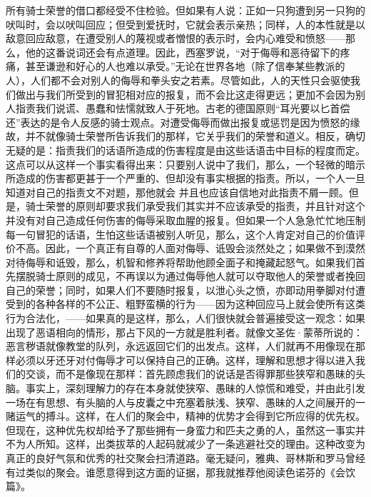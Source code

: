 \documentclass[12pt,oneside]{book}
\begin{document}
所有骑士荣誉的借口都经受不住检验。但如果有人说：正如一只狗遭到另一只狗的吠叫时，会以吠叫回应；但受到爱抚时，它就会表示亲热；同样，人的本性就是以敌意回应敌意，在遭受别人的蔑视或者憎恨的表示时，会内心难受和愤怒——那么，他的这番说词还会有点道理。因此，西塞罗说，“对于侮辱和恶待留下的疼痛，甚至谦逊和好心的人也难以承受。”无论在世界各地（除了信奉某些教派的人），人们都不会对别人的侮辱和拳头安之若素。尽管如此，人的天性只会驱使我们做出与我们所受到的冒犯相对应的报复，而不会比这走得更远；更加不会因为别人指责我们说谎、愚蠢和怯懦就致人于死地。古老的德国原则“耳光要以匕首偿还”表达的是令人反感的骑士观点。对遭受侮辱而做出报复或惩罚是因为愤怒的缘故，并不就像骑士荣誉所告诉我们的那样，它关乎我们的荣誉和道义。相反，确切无疑的是：指责我们的话语所造成的伤害程度是由这些话语击中目标的程度而定。这点可以从这样一个事实看得出来：只要别人说中了我们，那么，一个轻微的暗示所造成的伤害都更甚于一个严重的、但却没有事实根据的指责。所以，一个人一旦知道对自己的指责文不对题，那他就会
并且也应该自信地对此指责不屑一顾。但是，骑士荣誉的原则却要求我们承受我们其实并不应该承受的指责，并且针对这个并没有对自己造成任何伤害的侮辱采取血腥的报复。但如果一个人急急忙忙地压制每一句冒犯的话语，生怕这些话语被别人听见，那么，这个人肯定对自己的价值评价不高。因此，一个真正有自尊的人面对侮辱、诋毁会淡然处之；如果做不到漠然对待侮辱和诋毁，那么，机智和修养将帮助他顾全面子和掩藏起怒气。如果我们首先摆脱骑士原则的成见，不再误以为通过侮辱他人就可以夺取他人的荣誉或者挽回自己的荣誉；同时，如果人们不要随时报复，以泄心头之愤，亦即动用拳脚对付遭受到的各种各样的不公正、粗野蛮横的行为——因为这种回应马上就会使所有这类行为合法化，——如果真的是这样，那么，人们很快就会普遍接受这一观念：如果出现了恶语相向的情形，那占下风的一方就是胜利者。就像文圣佐·蒙蒂所说的：恶言秽语就像教堂的队列，永远返回它们的出发点。这样，人们就再不用像现在那样必须以牙还牙对付侮辱才可以保持自己的正确。这样，理解和思想才得以进入我们的交谈，而不是像现在那样：首先顾虑我们的说话是否得罪那些狭窄和愚昧的头脑。事实上，深刻理解力的存在本身就使狭窄、愚昧的人惊慌和难受，并由此引发一场在有思想、有头脑的人与皮囊之中充塞着肤浅、狭窄、愚昧的人之间展开的一赌运气的搏斗。这样，在人们的聚会中，精神的优势才会得到它所应得的优先权。但现在，这种优先权却给予了那些拥有一身蛮力和匹夫之勇的人，虽然这一事实并不为人所知。这样，出类拔萃的人起码就减少了一条逃避社交的理由。这种改变为真正的良好气氛和优秀的社交聚会扫清道路。毫无疑问，雅典、哥林斯和罗马曾经有过类似的聚会。谁愿意得到这方面的证据，那我就推荐他阅读色诺芬的《会饮篇》。 
\end{document}
